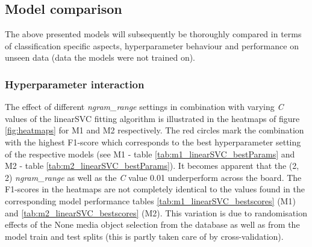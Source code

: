 \subsection{Model comparison}
The above presented models will subsequently be thoroughly compared in terms of classification specific aspects, hyperparameter behaviour and performance on unseen data (data the models were not trained on). 

\subsubsection{Hyperparameter interaction}
The effect of different \textit{ngram\_range} settings in combination with varying \textit{C} values of the linearSVC fitting algorithm is illustrated in the heatmaps of figure \ref{fig:heatmaps} for M1 and M2 respectively. The red circles mark the combination with the highest F1-score which corresponds to the best hyperparameter setting of the respective models (see M1 - table \ref{tab:m1_linearSVC_bestParams} and M2 - table \ref{tab:m2_linearSVC_bestParams}). It becomes apparent that the (2, 2) \textit{ngram\_range} as well as the \textit{C} value 0.01 underperform across the board. The F1-scores in the heatmaps are not completely identical to the values found in the corresponding model performance tables \ref{tab:m1_linearSVC_bestscores} (M1) and \ref{tab:m2_linearSVC_bestscores} (M2). This variation is due to randomisation effects of the None media object selection from the database as well as from the model train and test splits (this is partly taken care of by cross-validation).\\


